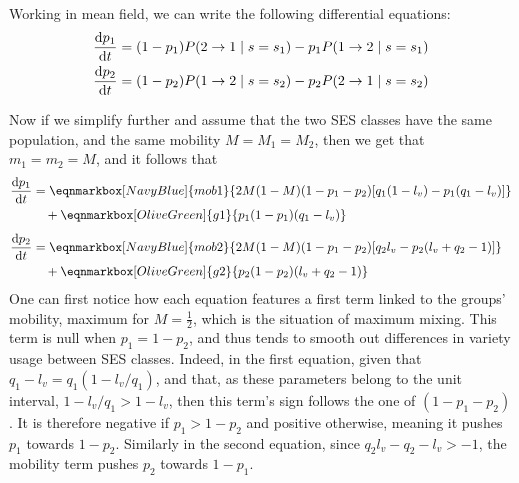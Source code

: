\documentclass[../thesis.tex]{subfiles}
\begin{document}
Working in mean field, we can write the following differential equations:
\begin{equation}
    \label{eq:time_evol}
    \begin{aligned}
        \dv{p_1}{t} 
            &= (1 - p_1) P(2 \rightarrow 1 \mid s = s_1)
                - p_1 P(1 \rightarrow 2 \mid s = s_1)
        \\
        \dv{p_2}{t} 
            &= (1 - p_2) P(1 \rightarrow 2 \mid s = s_2)
                 - p_2 P(2 \rightarrow 1 \mid s = s_2)
    \end{aligned}
\end{equation}

Now if we simplify further and assume that the two \ac{SES} classes have the same
population, and the same mobility $M = M_1 = M_2$, then we get that $m_1 = m_2 = M$, and
it follows that
\begin{equation}
  \label{eq:time_evol_eq_mob}
  \begin{aligned}
      \dv{p_1}{t} 
          &= \eqnmarkbox[NavyBlue]{mob1}{
            2 M (1 - M) (1 - p_1 - p_2) [q_1 (1 - l_v) - p_1 (q_1 - l_v)]
          }
      \\
          & \quad + \eqnmarkbox[OliveGreen]{g1}{p_1 (1 - p_1) (q_1 - l_v)}
      \\[1ex]
      \dv{p_2}{t} 
          &= \eqnmarkbox[NavyBlue]{mob2}{
            2 M (1 - M) (1 - p_1 - p_2) [q_2 l_v - p_2 (l_v + q_2 - 1)]
          }
      \\
          & \quad + \eqnmarkbox[OliveGreen]{g2}{p_2 (1 - p_2) (l_v + q_2 - 1)}
  \end{aligned}
\end{equation}
One can first notice how each equation features a first term linked to the groups'
mobility, maximum for $M = \frac{1}{2}$, which is the situation of maximum mixing. This
term is null when $p_1 = 1 - p_2$, and thus tends to smooth out differences in variety
usage between \ac{SES} classes. Indeed, in the first equation, given that $q_1 - l_v =
q_1 (1 - l_v / q_1)$, and that, as these parameters belong to the unit interval, $1 -
l_v / q_1 > 1 - l_v$, then this term's sign follows the one of $(1 - p_1 - p_2)$. It is
therefore negative if $p_1 > 1 - p_2$ and positive otherwise, meaning it pushes $p_1$
towards $1 - p_2$. Similarly in the second equation, since $q_2 l_v - q_2 - l_v > -1$,
the mobility term pushes $p_2$ towards $1 - p_1$.
\end{document}
